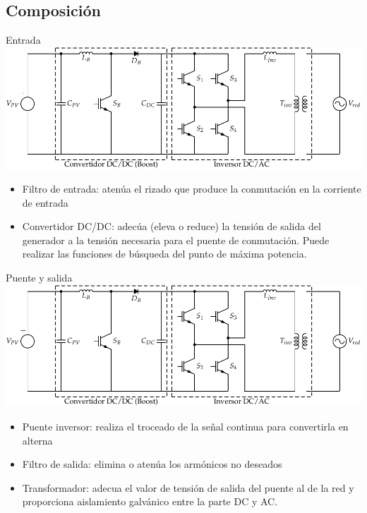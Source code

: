 \documentclass[xcolor={usenames,svgnames,dvipsnames}]{beamer}
\begin{document}
\subsection{Composición}
\label{sec-2-4}
\begin{frame}[label=sec-2-4-1]{Entrada}
\includegraphics[width=.9\linewidth]{../figs/InversorPV.pdf}

\begin{itemize}
\item \alert{Filtro de entrada}: atenúa el rizado que produce la conmutación en
la corriente de entrada

\item \alert{Convertidor DC/DC}: adecúa (eleva o reduce) la tensión de salida del
generador a la tensión necesaria para el puente de conmutación. Puede
realizar las funciones de búsqueda del punto de máxima potencia.
\end{itemize}
\end{frame}

\begin{frame}[label=sec-2-4-2]{Puente y salida}
\includegraphics[width=.9\linewidth]{../figs/InversorPV.pdf}

\begin{itemize}
\item \alert{Puente inversor}: realiza el troceado de la señal continua para
convertirla en alterna

\item \alert{Filtro de salida}: elimina o atenúa los armónicos no deseados

\item \alert{Transformador}: adecua el valor de tensión de salida del puente al
de la red y proporciona aislamiento galvánico entre la parte DC y
AC.
\end{itemize}
\end{frame}
\end{document}
